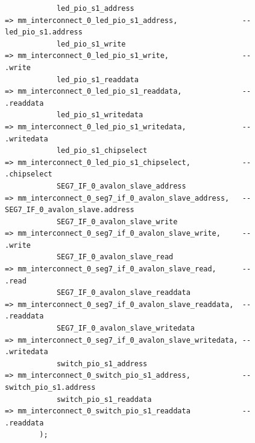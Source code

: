 \documentclass[conference]{IEEEtran}
\begin{document}
\begin{lstlisting}
			led_pio_s1_address                                                  => mm_interconnect_0_led_pio_s1_address,               --                                                    led_pio_s1.address
			led_pio_s1_write                                                    => mm_interconnect_0_led_pio_s1_write,                 --                                                              .write
			led_pio_s1_readdata                                                 => mm_interconnect_0_led_pio_s1_readdata,              --                                                              .readdata
			led_pio_s1_writedata                                                => mm_interconnect_0_led_pio_s1_writedata,             --                                                              .writedata
			led_pio_s1_chipselect                                               => mm_interconnect_0_led_pio_s1_chipselect,            --                                                              .chipselect
			SEG7_IF_0_avalon_slave_address                                      => mm_interconnect_0_seg7_if_0_avalon_slave_address,   --                                        SEG7_IF_0_avalon_slave.address
			SEG7_IF_0_avalon_slave_write                                        => mm_interconnect_0_seg7_if_0_avalon_slave_write,     --                                                              .write
			SEG7_IF_0_avalon_slave_read                                         => mm_interconnect_0_seg7_if_0_avalon_slave_read,      --                                                              .read
			SEG7_IF_0_avalon_slave_readdata                                     => mm_interconnect_0_seg7_if_0_avalon_slave_readdata,  --                                                              .readdata
			SEG7_IF_0_avalon_slave_writedata                                    => mm_interconnect_0_seg7_if_0_avalon_slave_writedata, --                                                              .writedata
			switch_pio_s1_address                                               => mm_interconnect_0_switch_pio_s1_address,            --                                                 switch_pio_s1.address
			switch_pio_s1_readdata                                              => mm_interconnect_0_switch_pio_s1_readdata            --                                                              .readdata
		);


\end{lstlisting}
\end{document}
